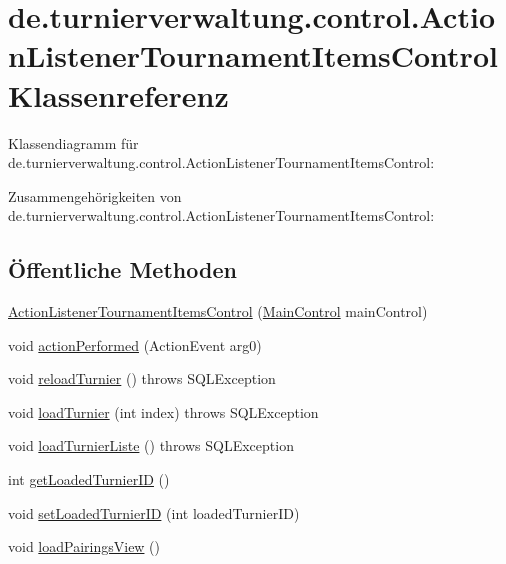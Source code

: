 \hypertarget{classde_1_1turnierverwaltung_1_1control_1_1_action_listener_tournament_items_control}{}\section{de.\+turnierverwaltung.\+control.\+Action\+Listener\+Tournament\+Items\+Control Klassenreferenz}
\label{classde_1_1turnierverwaltung_1_1control_1_1_action_listener_tournament_items_control}


Klassendiagramm für de.\+turnierverwaltung.\+control.\+Action\+Listener\+Tournament\+Items\+Control\+:


Zusammengehörigkeiten von de.\+turnierverwaltung.\+control.\+Action\+Listener\+Tournament\+Items\+Control\+:
\subsection*{Öffentliche Methoden}
\begin{DoxyCompactItemize}
\item 
\hyperlink{classde_1_1turnierverwaltung_1_1control_1_1_action_listener_tournament_items_control_a158a9759ac4b4cb9f5302f76352a2190}{Action\+Listener\+Tournament\+Items\+Control} (\hyperlink{classde_1_1turnierverwaltung_1_1control_1_1_main_control}{Main\+Control} main\+Control)
\item 
void \hyperlink{classde_1_1turnierverwaltung_1_1control_1_1_action_listener_tournament_items_control_a2aaa5872194d25d8b7b6aee47c038db6}{action\+Performed} (Action\+Event arg0)
\item 
void \hyperlink{classde_1_1turnierverwaltung_1_1control_1_1_action_listener_tournament_items_control_a093ead39725d46adcb32c0ef446674e6}{reload\+Turnier} ()  throws S\+Q\+L\+Exception 
\item 
void \hyperlink{classde_1_1turnierverwaltung_1_1control_1_1_action_listener_tournament_items_control_a8f9ade2f458d25ea66715045b0860d64}{load\+Turnier} (int index)  throws S\+Q\+L\+Exception 
\item 
void \hyperlink{classde_1_1turnierverwaltung_1_1control_1_1_action_listener_tournament_items_control_af081a8d5c6f638f089d8c8f4dfccc266}{load\+Turnier\+Liste} ()  throws S\+Q\+L\+Exception 
\item 
int \hyperlink{classde_1_1turnierverwaltung_1_1control_1_1_action_listener_tournament_items_control_aada466120471597fb11d4b56974b5466}{get\+Loaded\+Turnier\+ID} ()
\item 
void \hyperlink{classde_1_1turnierverwaltung_1_1control_1_1_action_listener_tournament_items_control_a3ef7f8ae5b0a879185eaabee8b69270b}{set\+Loaded\+Turnier\+ID} (int loaded\+Turnier\+ID)
\item 
void \hyperlink{classde_1_1turnierverwaltung_1_1control_1_1_action_listener_tournament_items_control_ae157df20a6c78d6e1018e373aee82144}{load\+Pairings\+View} ()
\end{DoxyCompactItemize}


